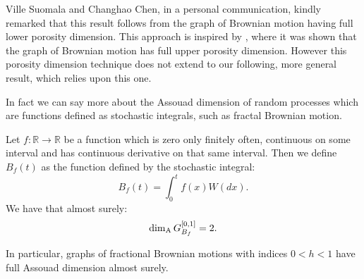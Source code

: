 Ville Suomala and Changhao Chen, in a personal communication, kindly remarked that this result follows from the graph of Brownian motion having full lower porosity dimension. This approach is inspired by \cite{coxgriffin}, where it was shown that the graph of Brownian motion has full upper porosity dimension. However this porosity dimension technique does not extend to our following, more general result, which relies upon this one.

In fact we can say more about the Assouad dimension of random processes which are functions defined as stochastic integrals, such as fractal Brownian motion. 

\begin{thm}
	Let $f:\mathbb{R}\to\mathbb{R}$ be a function which is zero only finitely often, continuous on some interval and has continuous derivative on that same interval. Then we define $B_f(t)$ as the function defined by the stochastic integral:
	\[	
	B_f(t)=\int_0^t f(x) W(dx).
	\]
	We have that almost surely:
	\[
	\dim_{\textup{A}} G_{B_f}^{[0,1]}=2.
	\]
\end{thm}
\begin{rem}
	In particular, graphs of fractional Brownian motions with indices $0<h<1$ have full Assouad dimension almost surely.
\end{rem}
